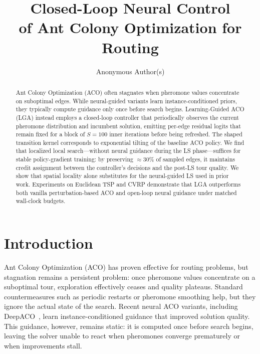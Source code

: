 \documentclass[sigconf,anonymous,review]{acmart}
\title{Closed-Loop Neural Control \\ of Ant Colony Optimization for Routing}
\author{Anonymous Author(s)}
\affiliation{
  \institution{Anonymous Institution}
}
\date{}
\theoremstyle{definition}
\theoremstyle{plain}
\newcommand{\TSP}{\textsc{TSP}}
\newcommand{\CVRP}{\textsc{CVRP}}
\newcommand{\LGA}{\textsc{LGA}}
\begin{document}
\begin{abstract}
Ant Colony Optimization (ACO) often stagnates when pheromone values concentrate on suboptimal edges. While neural-guided variants learn instance-conditioned priors, they typically compute guidance only once before search begins.
Learning-Guided ACO (\LGA{}) instead employs a closed-loop controller that periodically observes the current pheromone distribution and incumbent solution, emitting per-edge residual logits that remain fixed for a block of $S=100$ inner iterations before being refreshed.
The shaped transition kernel corresponds to exponential tilting of the baseline ACO policy.
We find that localized local search---without neural guidance during the LS phase---suffices for stable policy-gradient training: by preserving $\approx 30\%$ of sampled edges, it maintains credit assignment between the controller's decisions and the post-LS tour quality.
We show that spatial locality alone substitutes for the neural-guided LS used in prior work.
Experiments on Euclidean \TSP{} and \CVRP{} demonstrate that \LGA{} outperforms both vanilla perturbation-based ACO and open-loop neural guidance under matched wall-clock budgets.
\end{abstract}

\maketitle


\section{Introduction}

Ant Colony Optimization (ACO) has proven effective for routing problems, but stagnation remains a persistent problem: once pheromone values concentrate on a suboptimal tour, exploration effectively ceases and quality plateaus.
Standard countermeasures such as periodic restarts or pheromone smoothing help, but they ignore the actual state of the search.
Recent neural ACO variants, including DeepACO~\cite{deepaco}, learn instance-conditioned guidance that improved solution quality. This guidance, however, remains static: it is computed once before search begins, leaving the solver unable to react when pheromones converge prematurely or when improvements stall.
\end{document}
